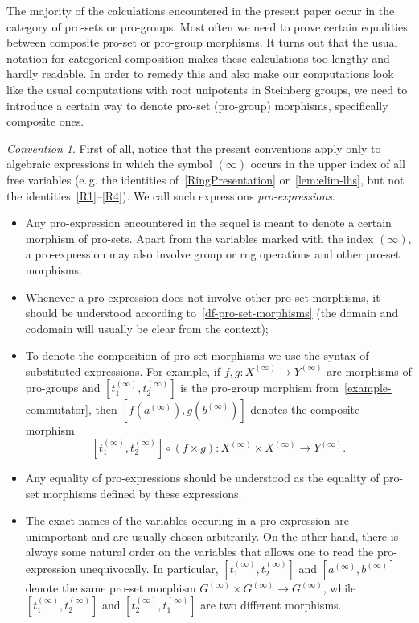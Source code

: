 \documentclass[oneside, 11pt]{amsart}
\numberwithin{equation}{section}
\theoremstyle{definition}
\theoremstyle{remark}
\newtheorem{conv}[lemma]{Convention} \Crefname{conv}{Convention}{Conventions}
\begin{document}
The majority of the calculations encountered in the present paper occur in the category of pro-sets or pro-groups.
Most often we need to prove certain equalities between composite pro-set or pro-group morphisms.
It turns out that the usual notation for categorical composition makes these calculations too lengthy and hardly readable. In order to remedy this and also make our computations look like the usual computations with root unipotents in Steinberg groups, we need to introduce a certain way to denote pro-set (pro-group) morphisms, specifically composite ones.

\begin{conv} \label{conv:notation}
First of all, notice that the present conventions apply only to algebraic expressions in which the symbol $(\infty)$ occurs in the upper index of all free variables (e.\,g. the identities of~\cref{RingPresentation} or~\cref{lem:elim-lhs}, but not the identities~\eqref{R1}--\eqref{R4}). We call such expressions {\it pro-expressions}.
 \begin{itemize}
  \item Any pro-expression encountered in the sequel is meant to denote a certain morphism of pro-sets. Apart from the variables marked with the index $(\infty)$, a pro-expression may also involve group or rng operations and other pro-set morphisms.
  \item Whenever a pro-expression does not involve other pro-set morphisms, it should be understood according to~\cref{df-pro-set-morphisms} (the domain and codomain will usually be clear from the context);
  \item To denote the composition of pro-set morphisms we use the syntax of substituted expressions. For example, if $f, g \colon X^{(\infty)} \to Y^{(\infty)}$ are morphisms of pro-groups and $[t_1^{(\infty)}, t_2^{(\infty)}]$ is the pro-group morphism from~\cref{example-commutator}, then $[f(a^{(\infty)}), g(b^{(\infty)})]$ denotes the composite morphism \[[t_1^{(\infty)}, t_2^{(\infty)}] \circ (f\times g) \colon X^{(\infty)} \times X^{(\infty)} \to Y^{(\infty)}.\]  
  \item Any equality of pro-expressions should be understood as the equality of pro-set morphisms defined by these expressions.
  \item The exact names of the variables occuring in a pro-expression are unimportant and are usually chosen arbitrarily. On the other hand, there is always some natural order on the variables that allows one to read the pro-expression unequivocally. In particular, $[t_1^{(\infty)}, t_2^{(\infty)}]$ and $[a^{(\infty)}, b^{(\infty)}]$ denote the same pro-set morphism $G^{(\infty)} \times G^{(\infty)} \to G^{(\infty)}$, while $[t_1^{(\infty)}, t_2^{(\infty)}]$ and $[t_2^{(\infty)}, t_1^{(\infty)}]$ are two different morphisms.

\end{itemize}
\end{conv}
\end{document}
